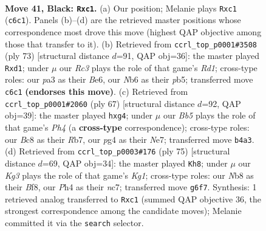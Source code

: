\documentclass[11pt]{article}
\begin{document}
\clearpage

\begin{figure}[p]\centering
\begin{subfigure}{0.46\textwidth}\centering
\resizebox{\linewidth}{!}{%
\newchessgame
\chessboard[
  setfen={1nb5/1p6/1nr3k1/pN1p1pp1/1b4Pp/PP2P2P/1B2PK2/2RB4 b - - 0 41},
  showmover=false,
  pgfstyle=straightmove, color=movearrow, markmove={c6-c1}
]}
\caption{}
\end{subfigure}\hfill
\begin{subfigure}{0.46\textwidth}\centering
\resizebox{\linewidth}{!}{%
\newchessgame
\chessboard[
  setfen={3r2k1/2p2p2/1p2b3/pPb1pN1p/P3P3/2P2PP1/2B1n2K/3RB3 b - - 4 37},
  showmover=false,
  pgfstyle=straightmove, color=movearrow, markmove={d8-d1}
]}
\caption{}
\end{subfigure}
\\[4pt]
\begin{subfigure}{0.46\textwidth}\centering
\resizebox{\linewidth}{!}{%
\newchessgame
\chessboard[
  setfen={8/1r2n1k1/2p2pp1/3p1b1p/1r1P2P1/4P2P/R4P1N/2RB2K1 b - - 0 34},
  showmover=false,
  pgfstyle=straightmove, color=movearrow, markmove={h5-g4}
]}
\caption{}
\end{subfigure}\hfill
\begin{subfigure}{0.46\textwidth}\centering
\resizebox{\linewidth}{!}{%
\newchessgame
\chessboard[
  setfen={1r3bk1/2NRnp2/7p/2p2Pp1/ppb1B1P1/P3P2P/1P4K1/2B5 b - - 0 38},
  showmover=false,
  pgfstyle=straightmove, color=movearrow, markmove={g8-h8}
]}
\caption{}
\end{subfigure}
\caption{\textbf{Move 41, Black: \texttt{Rxc1}.} (a) Our position; Melanie plays \texttt{Rxc1} (\texttt{c6c1}). Panels (b)--(d) are the retrieved master positions whose correspondence most drove this move (highest QAP objective among those that transfer to it). (b) Retrieved from \texttt{ccrl\_top\_p0001\#3508} (ply 73) [structural distance $d$=91, QAP obj=36]: the master played \texttt{Rxd1}; under $\mu$ our \emph{Rc3} plays the role of that game's \emph{Rd1}; cross-type roles: our \emph{p}a3 as their \emph{B}e6, our \emph{N}b6 as their \emph{p}b5; transferred move \texttt{c6c1} \textbf{(endorses this move)}. (c) Retrieved from \texttt{ccrl\_top\_p0001\#2060} (ply 67) [structural distance $d$=92, QAP obj=39]: the master played \texttt{hxg4}; under $\mu$ our \emph{Bb5} plays the role of that game's \emph{Ph4} (a \textbf{cross-type} correspondence); cross-type roles: our \emph{B}c8 as their \emph{R}b7, our \emph{p}g4 as their \emph{N}e7; transferred move \texttt{b4a3}. (d) Retrieved from \texttt{ccrl\_top\_p0003\#176} (ply 75) [structural distance $d$=69, QAP obj=34]: the master played \texttt{Kh8}; under $\mu$ our \emph{Kg3} plays the role of that game's \emph{Kg1}; cross-type roles: our \emph{N}b8 as their \emph{B}f8, our \emph{P}h4 as their \emph{n}c7; transferred move \texttt{g6f7}. Synthesis: 1 retrieved analog transferred to \texttt{Rxc1} (summed QAP objective 36, the strongest correspondence among the candidate moves); Melanie committed it via the \texttt{search} selector.}
\label{fig:thought-m81}
\end{figure}
\end{document}
